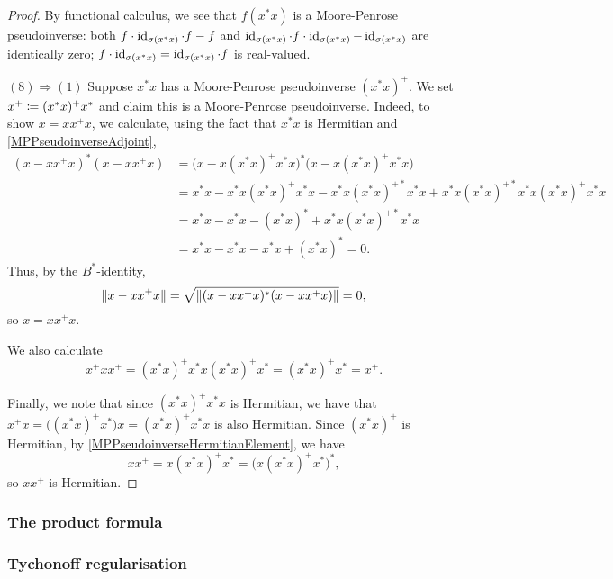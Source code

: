 \begin{proof}
By functional calculus, we see that $f(x^*x)$ is a Moore-Penrose pseudoinverse: both $f\cdot \operatorname{id}_{\sigma(x^*x)}\cdot f - f$ and $\operatorname{id}_{\sigma(x^*x)}\cdot f\cdot \operatorname{id}_{\sigma(x^*x)} - \operatorname{id}_{\sigma(x^*x)}$ are identically zero; $f\cdot \operatorname{id}_{\sigma(x^*x)} = \operatorname{id}_{\sigma(x^*x)}\cdot f$ is real-valued.

$(8) \Rightarrow (1)$ Suppose $x^*x$ has a Moore-Penrose pseudoinverse $(x^*x)^+$. We set $x^+ \coloneqq (x^*x)^+x^*$ and claim this is a Moore-Penrose pseudoinverse. Indeed, to show $x = xx^+x$, we calculate, using the fact that $x^*x$ is Hermitian and \ref{MPPseudoinverseAdjoint},
\begin{align*}
(x - xx^+x)^*(x - xx^+x) &= \big(x - x(x^*x)^+x^*x\big)^*\big(x - x(x^*x)^+x^*x\big) \\
&= x^*x - x^*x(x^*x)^+x^*x - x^*x(x^*x)^{+*}x^*x + x^*x(x^*x)^{+*}x^*x(x^*x)^+x^*x \\
&= x^*x - x^*x - (x^*x)^* + x^*x(x^*x)^{+*}x^*x \\
&= x^*x - x^*x - x^*x + (x^*x)^{*} = 0.
\end{align*}
Thus, by the $B^*$-identity,
\[ \lVert x - xx^+x\rVert = \sqrt{\lVert(x - xx^+x)^*(x - xx^+x)\rVert} = 0, \]
so $x = xx^+x$.

We also calculate
\[ x^+xx^+ = (x^*x)^+x^*x(x^*x)^+x^* = (x^*x)^+x^* = x^+. \]

Finally, we note that since $(x^*x)^+x^*x$ is Hermitian, we have that $x^+x = \big((x^*x)^+x^*\big)x = (x^*x)^+x^*x$ is also Hermitian. Since $(x^*x)^{+}$ is Hermitian, by \ref{MPPseudoinverseHermitianElement}, we have
\[ xx^+ = x(x^*x)^+x^* = \big(x(x^*x)^+x^*\big)^*, \]
so $xx^+$ is Hermitian.
\end{proof}

\subsubsection{The product formula}

\subsubsection{Tychonoff regularisation}

